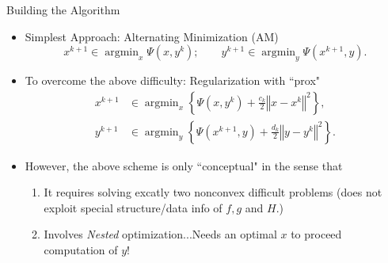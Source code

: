 \documentclass[9pt,handout]{beamer} %
\newcommand{\norm}[1]{\left\Vert {#1} \right\Vert} %
\newcommand{\argmin}{\operatorname{argmin}}
\begin{document}
	\begin{frame}{Building the Algorithm}
		\begin{itemize}
			\item Simplest Approach: Alternating Minimization (AM)
				\begin{equation*}
					x^{k + 1} \in \argmin_{x} \Psi\left(x , y^{k}\right); \qquad y^{k + 1} 
					\in \argmin_{y} \Psi\left(x^{k + 1} , y\right).
				\end{equation*}
		\end{itemize}
		\pause
        \begin{center}
	    \end{center}
		\begin{itemize}
			\item<3-> To overcome the above difficulty: Regularization with ``prox"
				\begin{align*}
					x^{k+1} & \in \argmin_{x} \left\{ \Psi\left(x , y^{k}\right) + \frac{c_{k}}
					{2}\norm{x - x^{k}}^{2} \right\}, \\
					y^{k + 1} & \in \argmin_{y} \left\{ \Psi\left(x^{k + 1} , y\right) + 
					\frac{d_{k}}{2}\norm{y - y^{k}}^{2} \right\}.
				\end{align*}
			\item<4-> However, the above scheme is only ``conceptual" in the sense that \medskip
				\begin{enumerate}
					\item<5-> It requires solving excatly two nonconvex difficult problems (does 
						not exploit special structure/data info of $f , g$
                        and $H$.) \medskip
					\item<6-> Involves {\em Nested} optimization...Needs an optimal $x$ to 
						proceed computation of $y$!
				\end{enumerate}
		\end{itemize}
		\pause\pause\pause\pause\pause           
		\begin{center}
        \end{center}
	\end{frame}
\end{document}
